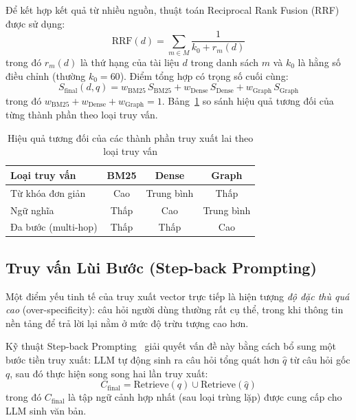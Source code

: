 \documentclass[12pt,a4paper]{report}
\theoremstyle{plain}
\theoremstyle{definition}
\begin{document}
	Để kết hợp kết quả từ nhiều nguồn, thuật toán Reciprocal Rank Fusion
	(RRF)~\cite{cormack2009reciprocal} được sử dụng:
	\begin{equation}
		\text{RRF}(d) = \sum_{m \in M} \frac{1}{k_0 + r_m(d)}
		\label{eq:rrf}
	\end{equation}
	trong đó $r_m(d)$ là thứ hạng của tài liệu $d$ trong danh sách $m$ và $k_0$
	là hằng số điều chỉnh (thường $k_0 = 60$). Điểm tổng hợp có trọng số cuối
	cùng:
	\begin{equation}
		S_{\text{final}}(d,q)
		= w_{\text{BM25}}\,S_{\text{BM25}}
		+ w_{\text{Dense}}\,S_{\text{Dense}}
		+ w_{\text{Graph}}\,S_{\text{Graph}}
		\label{eq:weighted_fusion}
	\end{equation}
	trong đó $w_{\text{BM25}} + w_{\text{Dense}} + w_{\text{Graph}} = 1$.
	Bảng~\ref{tab:retrieval_strategies} so sánh hiệu quả tương đối của từng thành
	phần theo loại truy vấn.
	
	\begin{table}[htbp]
		\centering
		\caption{Hiệu quả tương đối của các thành phần truy xuất lai theo loại truy vấn}
		\label{tab:retrieval_strategies}
		\begin{tabular}{lccc}
			\toprule
			\textbf{Loại truy vấn} & \textbf{BM25} & \textbf{Dense} & \textbf{Graph} \\
			\midrule
			Từ khóa đơn giản      & Cao           & Trung bình     & Thấp           \\
			Ngữ nghĩa             & Thấp          & Cao            & Trung bình     \\
			Đa bước (multi-hop)   & Thấp          & Thấp           & Cao            \\
			\bottomrule
		\end{tabular}
	\end{table}
	
	\subsection{Truy vấn Lùi Bước (Step-back Prompting)}
	\label{subsec:stepback_prompting}
	
	Một điểm yếu tinh tế của truy xuất vector trực tiếp là hiện tượng \emph{độ
		đặc thù quá cao} (over-specificity): câu hỏi người dùng thường rất cụ thể,
	trong khi thông tin nền tảng để trả lời lại nằm ở mức độ trừu tượng cao hơn.
	
	Kỹ thuật Step-back Prompting~\cite{neo4j2024essential} giải quyết vấn đề này
	bằng cách bổ sung một bước tiền truy xuất: LLM tự động sinh ra câu hỏi tổng
	quát hơn $\hat{q}$ từ câu hỏi gốc $q$, sau đó thực hiện song song hai lần
	truy xuất:
	\begin{equation}
		C_{\text{final}} = \text{Retrieve}(q) \cup \text{Retrieve}(\hat{q})
		\label{eq:stepback_retrieval}
	\end{equation}
	trong đó $C_{\text{final}}$ là tập ngữ cảnh hợp nhất (sau loại trùng lặp)
	được cung cấp cho LLM sinh văn bản.
	
\end{document}
